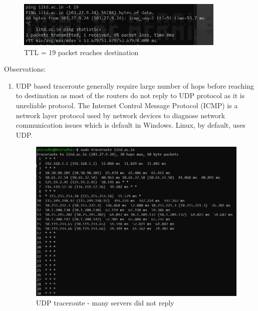 \documentclass[]{assignment}
\begin{document}
\begin{alphaparts}
        \begin{figure}[hbt!]
        \centering
        \includegraphics[width=10cm]{assignment-1/report/largeping.png}
        \caption{TTL = 19 packet reaches destination}
        \label{fig:galaxy}
        \end{figure}
        \pagebreak
        \questionpart
        Observations: 
            \begin{enumerate} 
                \item UDP based traceroute generally require large number of hops before reaching to destination as most of the routers do not reply to UDP protocol as it is unreliable protocol. The Internet Control Message Protocol (ICMP) is a network layer protocol used by network devices to diagnose network communication issues which is default in Windows. Linux, by default, uses UDP.     
                \begin{figure}[hbt!]
                \centering
                \includegraphics[width=16cm]{assignment-1/report/udpping.png}
                \caption{UDP traceroute - many servers did not reply}
                \label{fig:galaxy}
                \end{figure}
                

\end{enumerate}
\end{alphaparts}
\end{document}
